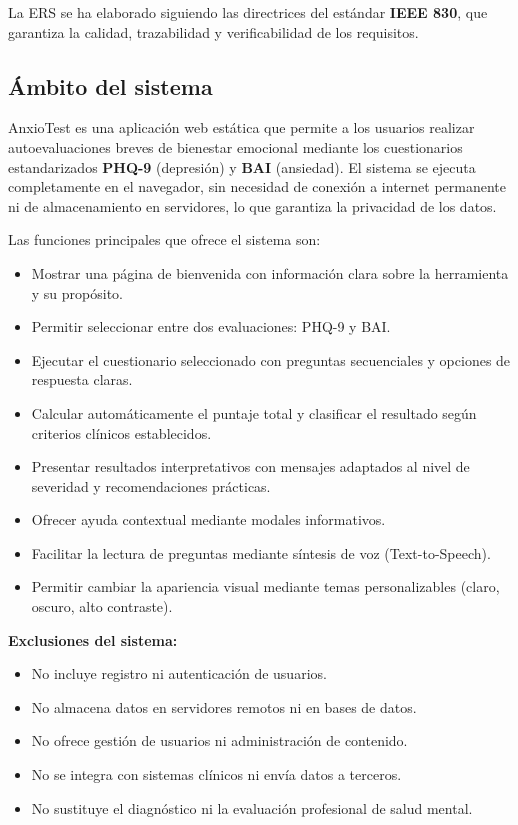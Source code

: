 La ERS se ha elaborado siguiendo las directrices del estándar \textbf{IEEE 830}, que garantiza la calidad, trazabilidad y verificabilidad de los requisitos.

\subsection{Ámbito del sistema}
\label{sec:ambito}

AnxioTest es una aplicación web estática que permite a los usuarios realizar autoevaluaciones breves de bienestar emocional mediante los cuestionarios estandarizados \textbf{PHQ-9} (depresión) y \textbf{BAI} (ansiedad). El sistema se ejecuta completamente en el navegador, sin necesidad de conexión a internet permanente ni de almacenamiento en servidores, lo que garantiza la privacidad de los datos.

Las funciones principales que ofrece el sistema son:

\begin{itemize}
  \item Mostrar una página de bienvenida con información clara sobre la herramienta y su propósito.
  \item Permitir seleccionar entre dos evaluaciones: PHQ-9 y BAI.
  \item Ejecutar el cuestionario seleccionado con preguntas secuenciales y opciones de respuesta claras.
  \item Calcular automáticamente el puntaje total y clasificar el resultado según criterios clínicos establecidos.
  \item Presentar resultados interpretativos con mensajes adaptados al nivel de severidad y recomendaciones prácticas.
  \item Ofrecer ayuda contextual mediante modales informativos.
  \item Facilitar la lectura de preguntas mediante síntesis de voz (Text-to-Speech).
  \item Permitir cambiar la apariencia visual mediante temas personalizables (claro, oscuro, alto contraste).
\end{itemize}

\textbf{Exclusiones del sistema:}

\begin{itemize}
  \item No incluye registro ni autenticación de usuarios.
  \item No almacena datos en servidores remotos ni en bases de datos.
  \item No ofrece gestión de usuarios ni administración de contenido.
  \item No se integra con sistemas clínicos ni envía datos a terceros.
  \item No sustituye el diagnóstico ni la evaluación profesional de salud mental.
\end{itemize}

